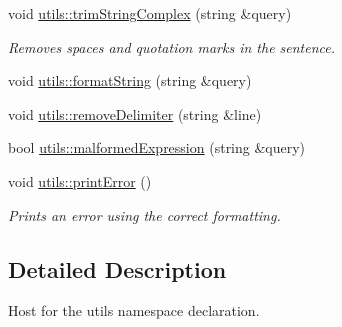\begin{DoxyCompactItemize}
void \hyperlink{namespaceutils_a0362c7510f0bb0c4449031f897626696}{utils\+::trim\+String\+Complex} (string \&query)
\begin{DoxyCompactList}\small\item\em Removes spaces and quotation marks in the sentence. \end{DoxyCompactList}\item 
void \hyperlink{namespaceutils_a8b0beed284a3321a1f9a08e23bdb3611}{utils\+::format\+String} (string \&query)
\item 
void \hyperlink{namespaceutils_adf961974462ef6e8d7ccc32311397d75}{utils\+::remove\+Delimiter} (string \&line)
\item 
bool \hyperlink{namespaceutils_a6c64225b3c1659211611f32e0776793b}{utils\+::malformed\+Expression} (string \&query)
\item 
void \hyperlink{namespaceutils_afd76dd21b41c50ce7396e30fb5d8d75b}{utils\+::print\+Error} ()
\begin{DoxyCompactList}\small\item\em Prints an error using the correct formatting. \end{DoxyCompactList}\end{DoxyCompactItemize}


\subsection{Detailed Description}
Host for the utils namespace declaration. 

